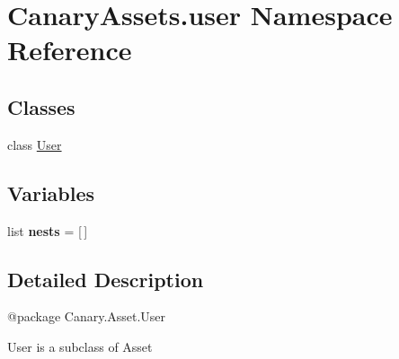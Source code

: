 \hypertarget{namespace_canary_assets_1_1user}{\section{Canary\-Assets.\-user Namespace Reference}
\label{namespace_canary_assets_1_1user}
}
\subsection*{Classes}
\begin{DoxyCompactItemize}
\item 
class \hyperlink{class_canary_assets_1_1user_1_1_user}{User}
\end{DoxyCompactItemize}
\subsection*{Variables}
\begin{DoxyCompactItemize}
\item 
\hypertarget{namespace_canary_assets_1_1user_aa6567ff0a4ec6ca0774281ed5149f44b}{list {\bfseries nests} = \mbox{[}$\,$\mbox{]}}\label{namespace_canary_assets_1_1user_aa6567ff0a4ec6ca0774281ed5149f44b}

\end{DoxyCompactItemize}


\subsection{Detailed Description}
\begin{DoxyVerb}@package Canary.Asset.User

User is a subclass of Asset
\end{DoxyVerb}
 